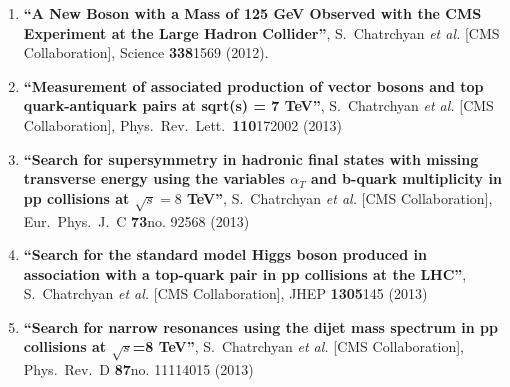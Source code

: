\begin{enumerate}
\item%
{\bf ``A New Boson with a Mass of 125 GeV Observed with the CMS Experiment at the Large Hadron Collider''}, 
  S.~Chatrchyan {\it et al.}  [CMS Collaboration], 
Science {\bf 338}1569 (2012). %


\item%
{\bf ``Measurement of associated production of vector bosons and top quark-antiquark pairs at sqrt(s) = 7 TeV''}, 
  S.~Chatrchyan {\it et al.}  [CMS Collaboration], 
Phys.\ Rev.\ Lett.\  {\bf 110}172002 (2013) %


\item%
{\bf ``Search for supersymmetry in hadronic final states with missing transverse energy using the variables $\alpha_T$ and b-quark multiplicity in pp collisions at $\sqrt s=8$ TeV''}, 
  S.~Chatrchyan {\it et al.}  [CMS Collaboration], 
Eur.\ Phys.\ J.\ C {\bf 73}no. 92568 (2013) %


\item%
{\bf ``Search for the standard model Higgs boson produced in association with a top-quark pair in pp collisions at the LHC''}, 
  S.~Chatrchyan {\it et al.}  [CMS Collaboration], 
JHEP {\bf 1305}145 (2013) %


\item%
{\bf ``Search for narrow resonances using the dijet mass spectrum in pp collisions at $\sqrt{s}$=8 TeV''}, 
  S.~Chatrchyan {\it et al.}  [CMS Collaboration], 
Phys.\ Rev.\ D {\bf 87}no. 11114015 (2013) %



\end{enumerate}
